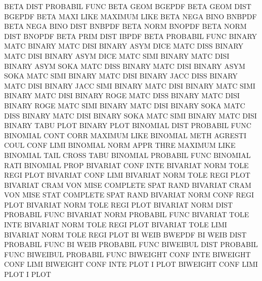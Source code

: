 BETA     DIST                           PROBABIL FUNC
BETA     GEOM                           BGEPDF
BETA     GEOM DIST                      BGEPDF
BETA     MAXI LIKE                      MAXIMUM  LIKE
BETA     NEGA BINO                      BNBPDF
BETA     NEGA BINO DIST                 BNBPDF
BETA     NORM                           BNOPDF
BETA     NORM DIST                      BNOPDF
BETA     PRIM DIST                      IBPDF
BETA                                    PROBABIL FUNC
BINARY   MATC                           BINARY   MATC DISI
BINARY   ASYM DICE MATC DISS            BINARY   MATC DISI
BINARY   ASYM DICE MATC SIMI            BINARY   MATC DISI
BINARY   ASYM SOKA MATC DISS            BINARY   MATC DISI
BINARY   ASYM SOKA MATC SIMI            BINARY   MATC DISI
BINARY   JACC DISS                      BINARY   MATC DISI
BINARY   JACC SIMI                      BINARY   MATC DISI
BINARY   MATC SIMI                      BINARY   MATC DISI
BINARY   ROGE MATC DISS                 BINARY   MATC DISI
BINARY   ROGE MATC SIMI                 BINARY   MATC DISI
BINARY   SOKA MATC DISS                 BINARY   MATC DISI
BINARY   SOKA MATC SIMI                 BINARY   MATC DISI
BINARY   TABU PLOT                      BINARY   PLOT
BINOMIAL DIST                           PROBABIL FUNC
BINOMIAL CONT CORR                      MAXIMUM  LIKE
BINOMIAL METH                           AGRESTI  COUL CONF LIMI
BINOMIAL NORM APPR THRE                 MAXIMUM  LIKE
BINOMIAL TAIL                           CROSS    TABU
BINOMIAL                                PROBABIL FUNC
BINOMIAL RATI                           BINOMIAL PROP
BIVARIAT CONF INTE                      BIVARIAT NORM TOLE REGI PLOT
BIVARIAT CONF LIMI                      BIVARIAT NORM TOLE REGI PLOT
BIVARIAT CRAM VON  MISE                 COMPLETE SPAT RAND
BIVARIAT CRAM VON  MISE STAT            COMPLETE SPAT RAND
BIVARIAT NORM CONF REGI PLOT            BIVARIAT NORM TOLE REGI PLOT
BIVARIAT NORM DIST                      PROBABIL FUNC
BIVARIAT NORM                           PROBABIL FUNC
BIVARIAT TOLE INTE                      BIVARIAT NORM TOLE REGI PLOT
BIVARIAT TOLE LIMI                      BIVARIAT NORM TOLE REGI PLOT
BI       WEIB                           BWEPDF
BI       WEIB DIST                      PROBABIL FUNC
BI       WEIB                           PROBABIL FUNC
BIWEIBUL DIST                           PROBABIL FUNC
BIWEIBUL                                PROBABIL FUNC
BIWEIGHT CONF INTE                      BIWEIGHT CONF LIMI
BIWEIGHT CONF INTE PLOT                 I        PLOT
BIWEIGHT CONF LIMI PLOT                 I        PLOT
